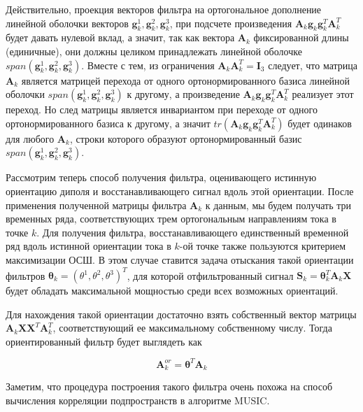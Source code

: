 Действительно, проекция векторов фильтра
на ортогональное дополнение линейной оболочки векторов
$\mathbf{g}_k^1, \mathbf{g}_k^2, \mathbf{g}_k^3$,
при подсчете произведения $\mathbf{A}_k \mathbf{g}_k \mathbf{g}_k^T \mathbf{A}_k^T$
будет давать нулевой вклад, а значит, так как вектора $\mathbf{A}_k$
фиксированной длины (единичные), они должны целиком принадлежать
линейной оболочке $span(\mathbf{g}_k^1, \mathbf{g}_k^2, \mathbf{g}_k^3)$.
Вместе с тем, из ограничения $\mathbf{A}_k \mathbf{A}_k^T = \mathbf{I}_3$ следует, что
матрица $\mathbf{A}_k$ является матрицей перехода от одного ортонормированного базиса
линейной оболочки $span(\mathbf{g}_k^1, \mathbf{g}_k^2, \mathbf{g}_k^3)$ к другому,
а произведение $\mathbf{A}_k \mathbf{g}_k \mathbf{g}_k^T \mathbf{A}_k^T$
реализует этот переход.
Но след матрицы является инвариантом при переходе от одного ортонормированного базиса к другому,
а значит $tr(\mathbf{A}_k \mathbf{g}_k \mathbf{g}_k^T \mathbf{A}_k^T)$
будет одинаков для любого $\mathbf{A}_k$, строки которого образуют ортонормированный базис
$span(\mathbf{g}_k^1, \mathbf{g}_k^2, \mathbf{g}_k^3)$.

Рассмотрим теперь способ получения фильтра, оценивающего истинную ориентацию диполя
и восстанавливающего сигнал вдоль этой ориентации.
После применения полученной матрицы фильтра $\mathbf{A}_k$ к данным,
мы будем получать три временных ряда, соответствующих трем ортогональным направлениям
тока в точке $k$. Для получения фильтра, восстанавливающего единственный временной ряд
вдоль истинной ориентации тока в $k$-ой точке также пользуются критерием максимизации ОСШ.
В этом случае ставится задача отыскания такой ориентации фильтров
$\boldsymbol{\theta}_k = {(\theta^1, \theta^2, \theta^3)}^T$, для
которой отфильтрованный сигнал $\mathbf{S}_k = \boldsymbol{\theta}_k^T \mathbf{A}_k \mathbf{X}$
будет обладать максимальной мощностью среди всех возможных ориентаций.

Для нахождения такой ориентации достаточно взять собственный вектор матрицы
$\mathbf{A}_k \mathbf{X}\mathbf{X}^T \mathbf{A}_k^T$,
соответствующий ее максимальному собственному числу.
Тогда ориентированный фильтр будет выглядеть как

\begin{equation}
    \mathbf{A}_{k}^{or} = \boldsymbol{\theta}^T \mathbf{A}_k
\end{equation}

Заметим, что процедура построения такого фильтра очень похожа на способ
вычисления корреляции подпространств в алгоритме MUSIC\@.

